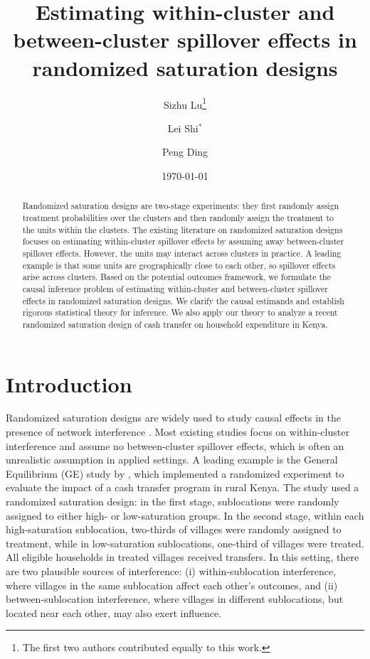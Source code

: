 \documentclass{article}
\title{Estimating within-cluster and between-cluster spillover effects in randomized saturation designs}
\author[1]{Sizhu Lu\thanks{The first two authors contributed equally to this work.}}
\author[2]{Lei Shi$^{*}$}
\author[1]{Peng Ding}
\affil[1]{Department of Statistics, University of California, Berkeley}
\affil[2]{Division of Biostatistics, University of California, Berkeley}
\date{\today}
\begin{document}
\maketitle
\begin{abstract}
    Randomized saturation designs are two-stage experiments: they first randomly assign treatment probabilities over the clusters and then randomly assign the treatment to the units within the clusters. The existing literature on randomized saturation designs focuses on estimating within-cluster spillover effects by assuming away between-cluster spillover effects. However, the units may interact across clusters in practice. A leading example is that some units are geographically close to each other, so spillover effects arise across clusters. Based on the potential outcomes framework, we formulate the causal inference problem of estimating within-cluster and between-cluster spillover effects in randomized saturation designs. We clarify the causal estimands and establish rigorous statistical theory for inference. We also apply our theory to analyze a recent randomized saturation design of cash transfer on household expenditure in Kenya.
\end{abstract}


\section{Introduction}
Randomized saturation designs are widely used to study causal effects in the presence of network interference \citep{hudgens2008toward}. Most existing studies focus on within-cluster interference and assume no between-cluster spillover effects, which is often an unrealistic assumption in applied settings. A leading example is the General Equilibrium (GE) study by \citet{egger2022general}, which implemented a randomized experiment to evaluate the impact of a cash transfer program in rural Kenya. The study used a randomized saturation design: in the first stage, sublocations were randomly assigned to either high- or low-saturation groups. In the second stage, within each high-saturation sublocation, two-thirds of villages were randomly assigned to treatment, while in low-saturation sublocations, one-third of villages were treated. All eligible households in treated villages received transfers. In this setting, there are two plausible sources of interference: (i) within-sublocation interference, where villages in the same sublocation affect each other’s outcomes, and (ii) between-sublocation interference, where villages in different sublocations, but located near each other, may also exert influence.
\end{document}
